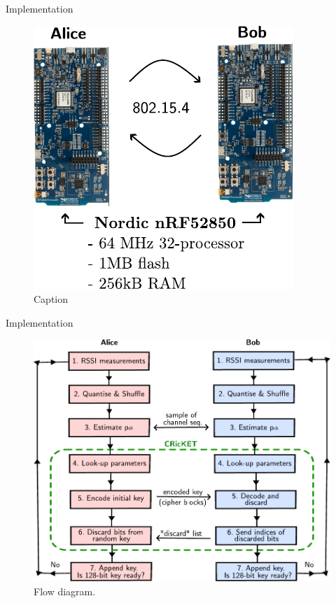 \begin{frame}{Implementation}
\begin{figure}
    \centering
    \includegraphics[scale = 0.9]{figures/Cricket/devices2.pdf}
    \caption{Caption}
    \label{fig:enter-label}
\end{figure}
    
\end{frame}

\begin{frame}{Implementation}
\begin{figure}
    \centering
    \includegraphics[scale = 0.5]{figures/Cricket/cricket_implentation.pdf}
    \caption{Flow diagram.}
    \label{fig:enter-label}
\end{figure}
\end{frame}

